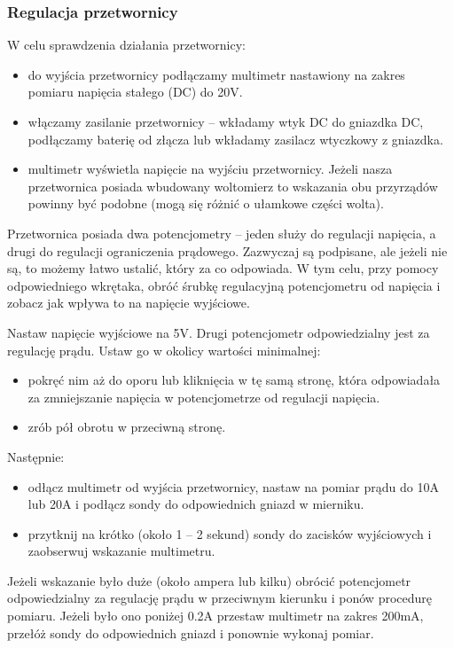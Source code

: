 \documentclass{pdfBooklets}
\begin{document}
\subsubsection{Regulacja przetwornicy}

W celu sprawdzenia działania przetwornicy:
\begin{itemize}
	\item do wyjścia przetwornicy podłączamy multimetr nastawiony na zakres pomiaru napięcia stałego (DC) do 20V.
	\item włączamy zasilanie przetwornicy – wkładamy wtyk DC do gniazdka DC, podłączamy baterię od złącza lub wkładamy zasilacz wtyczkowy z gniazdka.
	\item multimetr wyświetla napięcie na wyjściu przetwornicy. Jeżeli nasza przetwornica posiada wbudowany woltomierz to wskazania obu przyrządów powinny być podobne (mogą się różnić o ułamkowe części wolta).
\end{itemize}
\vspace*{\baselineskip}


Przetwornica posiada dwa potencjometry – jeden służy do regulacji napięcia, a drugi do regulacji ograniczenia prądowego. Zazwyczaj są podpisane, ale jeżeli nie są, to możemy łatwo ustalić, który za co odpowiada.
W tym celu, przy pomocy odpowiedniego wkrętaka, obróć śrubkę regulacyjną potencjometru od napięcia i zobacz jak wpływa to na napięcie wyjściowe.

Nastaw napięcie wyjściowe na 5V. Drugi potencjometr odpowiedzialny jest za regulację prądu. Ustaw go w okolicy wartości minimalnej:
\begin{itemize}
	\item pokręć nim aż do oporu lub kliknięcia w tę samą stronę, która odpowiadała za zmniejszanie napięcia w potencjometrze od regulacji napięcia.
	\item zrób pół obrotu w przeciwną stronę.
\end{itemize}
Następnie:
\begin{itemize}
	\item odłącz multimetr od wyjścia przetwornicy, nastaw na pomiar prądu do 10A lub 20A i podłącz sondy do odpowiednich gniazd w mierniku.
	\item przytknij na krótko (około 1 – 2 sekund) sondy do zacisków wyjściowych i zaobserwuj wskazanie multimetru.
\end{itemize}
Jeżeli wskazanie było duże (około ampera lub kilku) obrócić potencjometr odpowiedzialny za regulację prądu w przeciwnym kierunku i ponów procedurę pomiaru.
Jeżeli było ono poniżej 0.2A przestaw multimetr na zakres 200mA, przełóż sondy do odpowiednich gniazd i ponownie wykonaj pomiar.
\end{document}
